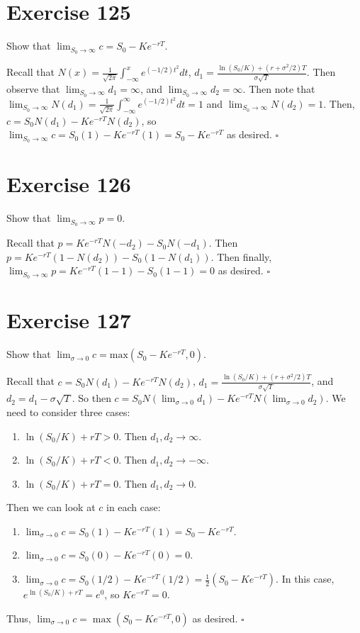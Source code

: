 \documentclass{article}
\begin{document}
\section*{Exercise 125}
Show that $\lim_{S_0\rightarrow\infty}c=S_0-Ke^{-rT}$.
\begin{flushleft}
    Recall that $N(x) = \frac{1}{\sqrt{2\pi}}\int_{-\infty}^{x}e^{(-1/2) t^2} dt$, $d_1 = \frac{\ln(S_0/K) + (r + \sigma^2/2)T}{\sigma \sqrt{T}}$. Then observe that
    $\lim_{S_0 \rightarrow \infty}d_1 = \infty$, and $\lim_{S_0 \rightarrow \infty}d_2 = \infty$.
    Then note that $\lim_{S_0 \rightarrow \infty}N(d_1) = \frac{1}{\sqrt{2\pi}}\int_{-\infty}^{\infty}e^{(-1/2) t^2} dt = 1$ and $\lim_{S_0 \rightarrow \infty}N(d_2) =1$.
    Then, $c = S_0N(d_1) - Ke^{-rT}N(d_2)$, so $\lim_{S_0 \rightarrow \infty}c = S_0(1) - Ke^{-rT}(1) = S_0 - Ke^{-rT}$ as desired. $\square$
\end{flushleft}

\section*{Exercise 126}
Show that $\lim_{S_0 \rightarrow \infty}p = 0$.
\begin{flushleft}
    Recall that $p = Ke^{-rT}N(-d_2) - S_0N(-d_1)$. Then $p = Ke^{-rT}(1 - N(d_2)) - S_0(1-N(d_1))$. Then finally, $\lim_{S_0 \rightarrow \infty}p = Ke^{-rT}(1-1) - S_0(1-1) = 0$ as desired. $\square$
\end{flushleft}

\section*{Exercise 127}
Show that $\lim_{\sigma\rightarrow 0}c=\text{max}(S_0-Ke^{-rT},0)$.
\begin{flushleft}
    Recall that $c = S_0N(d_1) - Ke^{-rT}N(d_2)$, $d_1 = \frac{\ln(S_0/K) + (r + \sigma^2/2)T}{\sigma \sqrt{T}}$, and $d_2 = d_1 - \sigma \sqrt{T}$.
    So then $c = S_0 N(\lim_{\sigma \rightarrow 0}d_1) - Ke^{-rT}N(\lim_{\sigma \rightarrow 0}d_2)$. We need to consider three cases:
    \begin{enumerate}
        \item $\ln(S_0/K) + rT > 0$. Then $d_1, d_2 \rightarrow \infty$.
        \item $\ln(S_0/K) + rT < 0$. Then $d_1, d_2 \rightarrow -\infty$.
        \item $\ln(S_0/K) + rT = 0$. Then $d_1, d_2 \rightarrow 0$.
    \end{enumerate}
    Then we can look at $c$ in each case:
    \begin{enumerate}
        \item $\lim_{\sigma \rightarrow 0}c = S_0(1) - Ke^{-rT}(1) = S_0 - Ke^{-rT}$.
        \item $\lim_{\sigma \rightarrow 0}c = S_0(0) - Ke^{-rT}(0) = 0$.
        \item $\lim_{\sigma \rightarrow 0}c = S_0(1/2) - Ke^{-rT}(1/2) = \frac{1}{2}(S_0 - Ke^{-rT})$. In this case, $e^{\ln(S_0/K) + rT} = e^0$, so $Ke^{-rT} = 0$.
    \end{enumerate}
    Thus, $\lim_{\sigma \rightarrow 0}c =\max(S_0 - Ke^{-rT}, 0)$ as desired. $\square$
\end{flushleft}
\end{document}
